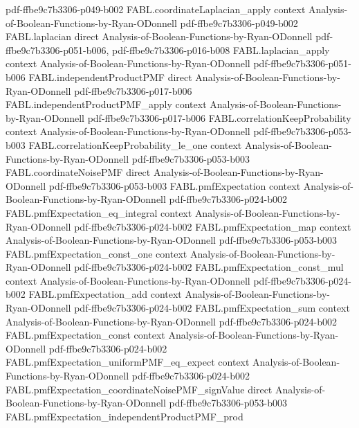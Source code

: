 \begin{theorem}
  {pdf-ffbe9c7b3306-p049-b002}
\proofstep
  {FABL.coordinateLaplacian_apply}
  {context}
  {Analysis-of-Boolean-Functions-by-Ryan-ODonnell}
  {pdf-ffbe9c7b3306-p049-b002}
\proofstep
  {FABL.laplacian}
  {direct}
  {Analysis-of-Boolean-Functions-by-Ryan-ODonnell}
  {pdf-ffbe9c7b3306-p051-b006,
    pdf-ffbe9c7b3306-p016-b008}
\proofstep
  {FABL.laplacian_apply}
  {context}
  {Analysis-of-Boolean-Functions-by-Ryan-ODonnell}
  {pdf-ffbe9c7b3306-p051-b006}
\proofstep
  {FABL.independentProductPMF}
  {direct}
  {Analysis-of-Boolean-Functions-by-Ryan-ODonnell}
  {pdf-ffbe9c7b3306-p017-b006}
\proofstep
  {FABL.independentProductPMF_apply}
  {context}
  {Analysis-of-Boolean-Functions-by-Ryan-ODonnell}
  {pdf-ffbe9c7b3306-p017-b006}
\proofstep
  {FABL.correlationKeepProbability}
  {context}
  {Analysis-of-Boolean-Functions-by-Ryan-ODonnell}
  {pdf-ffbe9c7b3306-p053-b003}
\proofstep
  {FABL.correlationKeepProbability_le_one}
  {context}
  {Analysis-of-Boolean-Functions-by-Ryan-ODonnell}
  {pdf-ffbe9c7b3306-p053-b003}
\proofstep
  {FABL.coordinateNoisePMF}
  {direct}
  {Analysis-of-Boolean-Functions-by-Ryan-ODonnell}
  {pdf-ffbe9c7b3306-p053-b003}
\proofstep
  {FABL.pmfExpectation}
  {context}
  {Analysis-of-Boolean-Functions-by-Ryan-ODonnell}
  {pdf-ffbe9c7b3306-p024-b002}
\proofstep
  {FABL.pmfExpectation_eq_integral}
  {context}
  {Analysis-of-Boolean-Functions-by-Ryan-ODonnell}
  {pdf-ffbe9c7b3306-p024-b002}
\proofstep
  {FABL.pmfExpectation_map}
  {context}
  {Analysis-of-Boolean-Functions-by-Ryan-ODonnell}
  {pdf-ffbe9c7b3306-p053-b003}
\proofstep
  {FABL.pmfExpectation_const_one}
  {context}
  {Analysis-of-Boolean-Functions-by-Ryan-ODonnell}
  {pdf-ffbe9c7b3306-p024-b002}
\proofstep
  {FABL.pmfExpectation_const_mul}
  {context}
  {Analysis-of-Boolean-Functions-by-Ryan-ODonnell}
  {pdf-ffbe9c7b3306-p024-b002}
\proofstep
  {FABL.pmfExpectation_add}
  {context}
  {Analysis-of-Boolean-Functions-by-Ryan-ODonnell}
  {pdf-ffbe9c7b3306-p024-b002}
\proofstep
  {FABL.pmfExpectation_sum}
  {context}
  {Analysis-of-Boolean-Functions-by-Ryan-ODonnell}
  {pdf-ffbe9c7b3306-p024-b002}
\proofstep
  {FABL.pmfExpectation_const}
  {context}
  {Analysis-of-Boolean-Functions-by-Ryan-ODonnell}
  {pdf-ffbe9c7b3306-p024-b002}
\proofstep
  {FABL.pmfExpectation_uniformPMF_eq_expect}
  {context}
  {Analysis-of-Boolean-Functions-by-Ryan-ODonnell}
  {pdf-ffbe9c7b3306-p024-b002}
\proofstep
  {FABL.pmfExpectation_coordinateNoisePMF_signValue}
  {direct}
  {Analysis-of-Boolean-Functions-by-Ryan-ODonnell}
  {pdf-ffbe9c7b3306-p053-b003}
\proofstep
  {FABL.pmfExpectation_independentProductPMF_prod}

\end{theorem}
